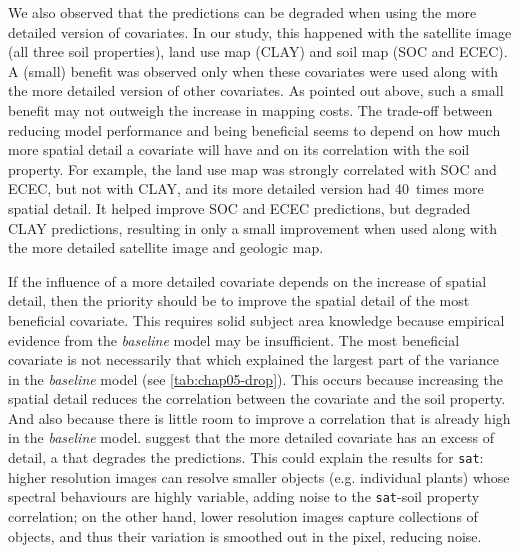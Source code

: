 We also observed that the predictions can be degraded when using the more detailed version of covariates. In 
our study, this happened with the satellite image (all three soil properties), land use map (CLAY) and soil 
map (SOC and ECEC). A (small) benefit was observed only when these covariates were used along with the more 
detailed version of other covariates. As pointed out above, such a small benefit may not outweigh the increase 
in mapping costs. The trade-off between reducing model performance and being beneficial seems to depend on how 
much more spatial detail a covariate will have and on its correlation with the soil property. For example, the 
land use map was strongly correlated with SOC and ECEC, but not with CLAY, and its more detailed version had 
\num{40}~times more spatial detail. It helped improve SOC and ECEC predictions, but degraded CLAY predictions, 
resulting in only a small improvement when used along with the more detailed satellite image and geologic map.

If the influence of a more detailed covariate depends on the increase of spatial detail, then the priority 
should be to improve the spatial detail of the most beneficial covariate. This requires solid subject area 
knowledge because empirical evidence from the \emph{baseline} model may be insufficient. The most beneficial 
covariate is not necessarily that which explained the largest part of the variance in the \emph{baseline} 
model (see \autoref{tab:chap05-drop}). This occurs because increasing the spatial detail reduces the 
correlation between the covariate and the soil property. And also because there is little room to improve a 
correlation that is already high in the \emph{baseline} model.  suggest that the 
more detailed covariate has an excess of detail, a  that degrades the predictions. This could explain 
the results for \texttt{sat}: higher resolution images can resolve smaller objects (e.g. individual plants) 
whose spectral behaviours are highly variable, adding noise to the \texttt{sat}-soil property correlation; on 
the other hand, lower resolution images capture collections of objects, and thus their variation is smoothed 
out in the pixel, reducing noise.

